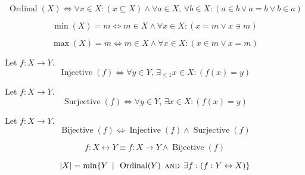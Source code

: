 \documentclass{main}
\begin{document}
\begin{definition}[Ordinal]
$$
	\operatorname{Ordinal}(X)
	\Leftrightarrow
	\forall x\in X:(
		x\subseteq X
	)
	\land
	\forall a\in X,\,
	\forall b\in X:(
		a\in b
		\lor
		a=b
		\lor
		b\in a
	)
$$
\end{definition}

\begin{definition}[Minimum]
$$
	\min(X)=m
	\Leftrightarrow
	m\in X
	\land
	\forall x\in X:(
		x=m
		\lor
		x\ni m
	)
$$
\end{definition}

\begin{definition}[Maximum]
$$
	\max(X)=m
	\Leftrightarrow
	m\in X
	\land
	\forall x\in X:(
		x\in m
		\lor
		x=m
	)
$$
\end{definition}

\begin{definition}
Let $f:X\to Y$.
$$
	\operatorname{Injective}(f)
	\Leftrightarrow
	\forall y\in Y,\,
	\exists_{\leq 1}x\in X:(
		f(x)=y
	)
$$
\end{definition}

\begin{definition}
Let $f:X\to Y$.
$$
	\operatorname{Surjective}(f)
	\Leftrightarrow
	\forall y\in Y,\,
	\exists x\in X:(
		f(x)=y
	)
$$
\end{definition}

\begin{definition}
Let $f:X\to Y$.
$$
	\operatorname{Bijective}(f)
	\Leftrightarrow
	\operatorname{Injective}(f)
	\land
	\operatorname{Surjective}(f)
$$
\end{definition}

\begin{notation}
$$
	f:X\leftrightarrow Y
	\equiv
	f:X\to Y
	\land
	\operatorname{Bijective}(f)
$$
\end{notation}

\begin{definition}[Cardinality]
$$
	\abs{X}
	=
	\min\{
		Y
		\enspace|\enspace
		\operatorname{Ordinal}(Y)
		\mkern8mu\textsc{and}\mkern8mu
		\exists f:(
			f:Y\leftrightarrow X
		)
	\}
$$
\end{definition}
\end{document}
